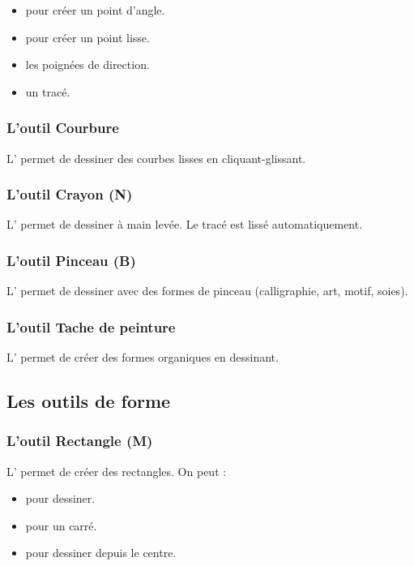 \begin{itemize}
    \item {} pour créer un point d'angle.
    \item {} pour créer un point lisse.
    \item {} les poignées de direction.
    \item {} un tracé.
\end{itemize}

\subsubsection{L'outil Courbure}

L' permet de dessiner des courbes lisses en cliquant-glissant.

\subsubsection{L'outil Crayon (N)}

L' permet de dessiner à main levée. Le tracé est lissé automatiquement.

\subsubsection{L'outil Pinceau (B)}

L' permet de dessiner avec des formes de pinceau (calligraphie, art, motif, soies).

\subsubsection{L'outil Tache de peinture}

L' permet de créer des formes organiques en dessinant.

\subsection{Les outils de forme}

\subsubsection{L'outil Rectangle (M)}

L' permet de créer des rectangles. On peut :

\begin{itemize}
    \item {} pour dessiner.
    \item {} pour un carré.
    \item {} pour dessiner depuis le centre.
\end{itemize}

